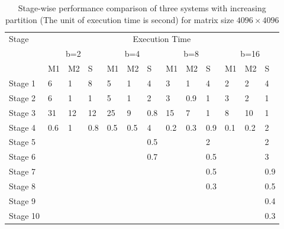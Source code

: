 \begin{table}[h!]
	\caption{Stage-wise performance comparison of three systems with increasing partition (The unit of execution time is second) for matrix size $4096\times 4096$}
	\label{tab:Stagewise-4096}
	\begin{minipage}{\columnwidth}
		\begin{center}
			\begin{tabular}{lllllllllllll}
				\toprule
				Stage & \multicolumn{12}{c}{Execution Time} \\
				& \multicolumn{3}{c}{b=2} & \multicolumn{3}{c}{b=4} & \multicolumn{3}{c}{b=8} & \multicolumn{3}{c}{b=16} \\
				& M1 & M2 & S & M1 & M2 & S & M1 & M2 & S & M1 & M2 & S \\	
				\toprule			
				Stage 1 & \cellcolor{green}6 & \cellcolor{green}1 & 8 & \cellcolor{green}5 & \cellcolor{green}1 & 4 & \cellcolor{green}3 & \cellcolor{green}1 & 4 & \cellcolor{green}2 & \cellcolor{green}2 & 4 \\				
				\toprule				
				Stage 2 & \cellcolor{green}6 & \cellcolor{green}1 & \cellcolor{green}1 & \cellcolor{green}5 & \cellcolor{green}1 & \cellcolor{green}2 & \cellcolor{green}3 & \cellcolor{green}0.9 & \cellcolor{green}1 & \cellcolor{green}3 & \cellcolor{green}2 & \cellcolor{green}1 \\
				\toprule
				Stage 3 & \cellcolor{red}31 & \cellcolor{red}12 & \cellcolor{red}12 & \cellcolor{red}25 & \cellcolor{red}9 & \cellcolor{green}0.8 & \cellcolor{red}15 & \cellcolor{red}7 & \cellcolor{green}1 & \cellcolor{red}8 & \cellcolor{red}10 & \cellcolor{green}1 \\
				\toprule
				Stage 4 & \cellcolor{green}0.6 & \cellcolor{green}1 & \cellcolor{green}0.8 & \cellcolor{green}0.5 & \cellcolor{green}0.5 & \cellcolor{red}4 & \cellcolor{green}0.2 & \cellcolor{green}0.3 & \cellcolor{green}0.9 & \cellcolor{green}0.1 & \cellcolor{green}0.2 & \cellcolor{green}2 \\
				\toprule
				Stage 5 & & & & & & \cellcolor{green}0.5 & & & \cellcolor{red}2 & & & \cellcolor{green}2 \\
				\toprule			
				Stage 6 & & & & & & \cellcolor{green}0.7 & & & \cellcolor{green}0.5 & & & \cellcolor{red}3 \\
				\toprule
				Stage 7 & & & & & & & & & \cellcolor{green}0.5 & & & \cellcolor{green}0.9 \\
				\toprule
				Stage 8 & & & & & & & & & \cellcolor{green}0.3 & & & \cellcolor{green}0.5 \\
				\toprule
				Stage 9 & & & & & & & & & & & & \cellcolor{green}0.4 \\
				\toprule
				Stage 10 & & & & & & & & & & & & \cellcolor{green}0.3 \\
				\bottomrule
			\end{tabular}
		\end{center}
	\end{minipage}
\end{table}

